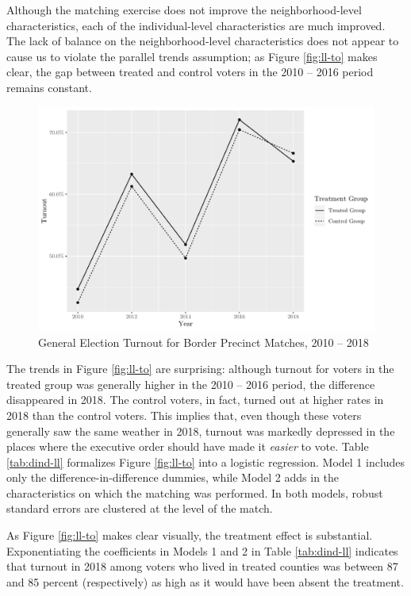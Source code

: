 \documentclass[
  12pt,
]{article}
\begin{document}
Although the matching exercise does not improve the neighborhood-level characteristics, each of the individual-level characteristics are much improved. The lack of balance on the neighborhood-level characteristics does not appear to cause us to violate the parallel trends assumption; as Figure \ref{fig:ll-to} makes clear, the gap between treated and control voters in the 2010 -- 2016 period remains constant.

\begin{figure}[H]

{\centering \includegraphics{hurricane_michael_files/figure-latex/ll-to-chunk-1} 

}

\caption{\label{fig:ll-to}General Election Turnout for Border Precinct Matches, 2010 -- 2018}\label{fig:ll-to-chunk}
\end{figure}

The trends in Figure \ref{fig:ll-to} are surprising: although turnout for voters in the treated group was generally higher in the 2010 -- 2016 period, the difference disappeared in 2018. The control voters, in fact, turned out at higher rates in 2018 than the control voters. This implies that, even though these voters generally saw the same weather in 2018, turnout was markedly depressed in the places where the executive order should have made it \emph{easier} to vote. Table \ref{tab:dind-ll} formalizes Figure \ref{fig:ll-to} into a logistic regression. Model 1 includes only the difference-in-difference dummies, while Model 2 adds in the characteristics on which the matching was performed. In both models, robust standard errors are clustered at the level of the match.

\begin{singlespace}


\end{singlespace}

As Figure \ref{fig:ll-to} makes clear visually, the treatment effect is substantial. Exponentiating the coefficients in Models 1 and 2 in Table \ref{tab:dind-ll} indicates that turnout in 2018 among voters who lived in treated counties was between 87 and 85 percent (respectively) as high as it would have been absent the treatment.
\end{document}
